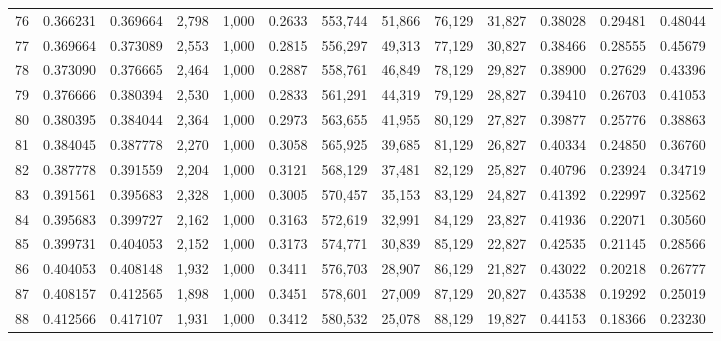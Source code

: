 \begin{tabular}{rrrrrrrrrrrrr}
76  &  0.366231 &  0.369664 &   2,798 &  1,000 &                                     0.2633 &  553,744 &   51,866 &   76,129 &   31,827 &  0.38028 &  0.29481 &  0.48044 \\
77  &  0.369664 &  0.373089 &   2,553 &  1,000 &                                     0.2815 &  556,297 &   49,313 &   77,129 &   30,827 &  0.38466 &  0.28555 &  0.45679 \\
78  &  0.373090 &  0.376665 &   2,464 &  1,000 &                                     0.2887 &  558,761 &   46,849 &   78,129 &   29,827 &  0.38900 &  0.27629 &  0.43396 \\
79  &  0.376666 &  0.380394 &   2,530 &  1,000 &                                     0.2833 &  561,291 &   44,319 &   79,129 &   28,827 &  0.39410 &  0.26703 &  0.41053 \\
80  &  0.380395 &  0.384044 &   2,364 &  1,000 &                                     0.2973 &  563,655 &   41,955 &   80,129 &   27,827 &  0.39877 &  0.25776 &  0.38863 \\
81  &  0.384045 &  0.387778 &   2,270 &  1,000 &                                     0.3058 &  565,925 &   39,685 &   81,129 &   26,827 &  0.40334 &  0.24850 &  0.36760 \\
82  &  0.387778 &  0.391559 &   2,204 &  1,000 &                                     0.3121 &  568,129 &   37,481 &   82,129 &   25,827 &  0.40796 &  0.23924 &  0.34719 \\
83  &  0.391561 &  0.395683 &   2,328 &  1,000 &                                     0.3005 &  570,457 &   35,153 &   83,129 &   24,827 &  0.41392 &  0.22997 &  0.32562 \\
84  &  0.395683 &  0.399727 &   2,162 &  1,000 &                                     0.3163 &  572,619 &   32,991 &   84,129 &   23,827 &  0.41936 &  0.22071 &  0.30560 \\
85  &  0.399731 &  0.404053 &   2,152 &  1,000 &                                     0.3173 &  574,771 &   30,839 &   85,129 &   22,827 &  0.42535 &  0.21145 &  0.28566 \\
86  &  0.404053 &  0.408148 &   1,932 &  1,000 &                                     0.3411 &  576,703 &   28,907 &   86,129 &   21,827 &  0.43022 &  0.20218 &  0.26777 \\
87  &  0.408157 &  0.412565 &   1,898 &  1,000 &                                     0.3451 &  578,601 &   27,009 &   87,129 &   20,827 &  0.43538 &  0.19292 &  0.25019 \\
88  &  0.412566 &  0.417107 &   1,931 &  1,000 &                                     0.3412 &  580,532 &   25,078 &   88,129 &   19,827 &  0.44153 &  0.18366 &  0.23230 \\

\end{tabular}
